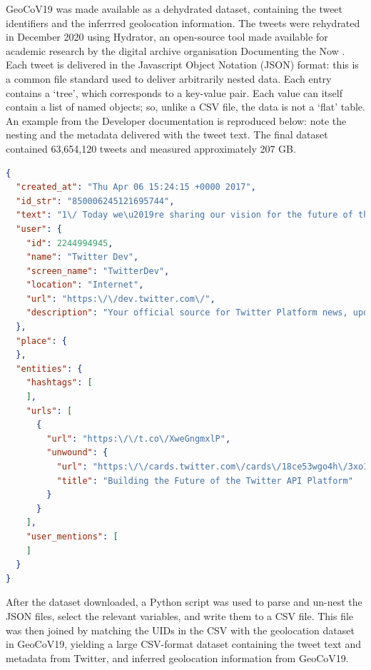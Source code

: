 \documentclass{article}
\begin{document}
GeoCoV19 was made available as a dehydrated dataset, containing the tweet identifiers and the inferrred geolocation information. The tweets were rehydrated in December 2020 using Hydrator, an open-source tool made available for academic research by the digital archive organisation Documenting the Now \parencite{summersHydrator2020}. Each tweet is delivered in the Javascript Object Notation (JSON) format: this is a common file standard used to deliver arbitrarily nested data. Each entry contains a `tree', which corresponds to a key-value pair. Each value can itself contain a list of named objects; so, unlike a CSV file, the data is not a `flat' table. An example from the Developer documentation is reproduced below: note the nesting and the metadata delivered with the tweet text. The final dataset contained 63,654,120 tweets and measured approximately 207 GB.
\begin{singlespace}
\begin{lstlisting}[language=json,numbers=none,caption=Example Tweet object JSON file \parencite{twitterinc.DataDictionaryStandard2021}]
{
  "created_at": "Thu Apr 06 15:24:15 +0000 2017",
  "id_str": "850006245121695744",
  "text": "1\/ Today we\u2019re sharing our vision for the future of the Twitter API platform!\nhttps:\/\/t.co\/XweGngmxlP",
  "user": {
    "id": 2244994945,
    "name": "Twitter Dev",
    "screen_name": "TwitterDev",
    "location": "Internet",
    "url": "https:\/\/dev.twitter.com\/",
    "description": "Your official source for Twitter Platform news, updates & events. Need technical help? Visit https:\/\/twittercommunity.com\/ \u2328\ufe0f #TapIntoTwitter"
  },
  "place": {   
  },
  "entities": {
    "hashtags": [      
    ],
    "urls": [
      {
        "url": "https:\/\/t.co\/XweGngmxlP",
        "unwound": {
          "url": "https:\/\/cards.twitter.com\/cards\/18ce53wgo4h\/3xo1c",
          "title": "Building the Future of the Twitter API Platform"
        }
      }
    ],
    "user_mentions": [     
    ]
  }
}
\end{lstlisting}
\end{singlespace}
After the dataset downloaded, a Python script was used to parse and un-nest the JSON files, select the relevant variables, and write them to a CSV file. This file was then joined by matching the UIDs in the CSV with the geolocation dataset in GeoCoV19, yielding a large CSV-format dataset containing the tweet text and metadata from Twitter, and inferred geolocation information from GeoCoV19.
\end{document}

